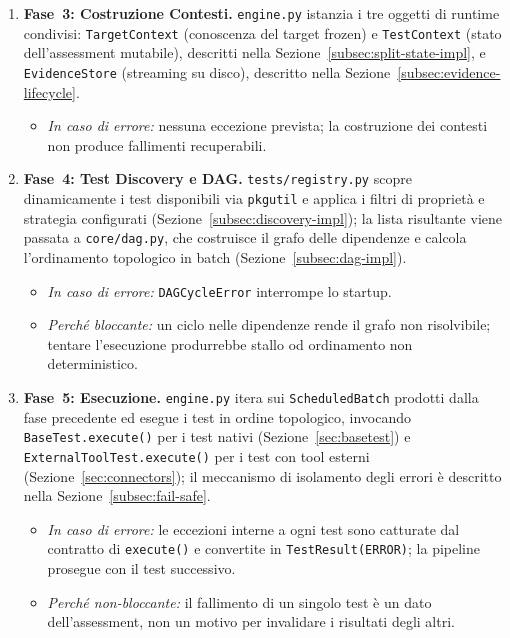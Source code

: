 \begin{enumerate}
      \item \textbf{Fase~3: Costruzione Contesti.} \texttt{engine.py} istanzia i
            tre oggetti di runtime condivisi: \texttt{TargetContext} (conoscenza del target frozen) e \texttt{TestContext} (stato dell'assessment mutabile),
            descritti nella Sezione~\ref{subsec:split-state-impl}, e
            \texttt{EvidenceStore} (streaming su disco), descritto nella Sezione~\ref{subsec:evidence-lifecycle}.
            \begin{itemize}
                  \item \textit{In caso di errore:} nessuna eccezione prevista; la costruzione
                        dei contesti non produce fallimenti recuperabili.
            \end{itemize}

      \item \textbf{Fase~4: Test Discovery e \gls{DAG}.} \texttt{tests/registry.py} scopre
            dinamicamente i test disponibili via \texttt{pkgutil} e applica i filtri di proprietà e strategia configurati (Sezione~\ref{subsec:discovery-impl}); la lista risultante
            viene passata a \texttt{core/dag.py}, che costruisce il grafo delle
            dipendenze e calcola l'ordinamento topologico in batch
            (Sezione~\ref{subsec:dag-impl}).
            \begin{itemize}
                  \item \textit{In caso di errore:} \texttt{DAGCycleError} interrompe
                        lo startup.
                  \item \textit{Perché bloccante:} un ciclo nelle dipendenze rende il grafo
                        non risolvibile; tentare l'esecuzione produrrebbe stallo od ordinamento
                        non deterministico.
            \end{itemize}

      \item \textbf{Fase~5: Esecuzione.} \texttt{engine.py} itera sui \texttt{ScheduledBatch}
            prodotti dalla fase precedente ed esegue i test in ordine topologico,
            invocando \texttt{BaseTest.execute()} per i test nativi (Sezione~\ref{sec:basetest})
            e \texttt{ExternalToolTest.execute()} per i test con tool esterni
            (Sezione~\ref{sec:connectors}); il meccanismo di isolamento degli errori
            è descritto nella Sezione~\ref{subsec:fail-safe}.
            \begin{itemize}
                  \item \textit{In caso di errore:} le eccezioni interne a ogni test sono
                        catturate dal contratto di \texttt{execute()} e convertite in
                        \texttt{TestResult(ERROR)}; la pipeline prosegue con il test successivo.
                  \item \textit{Perché non-bloccante:} il fallimento di un singolo test è
                        un dato dell'assessment, non un motivo per invalidare i risultati degli
                        altri.
            \end{itemize}


\end{enumerate}
